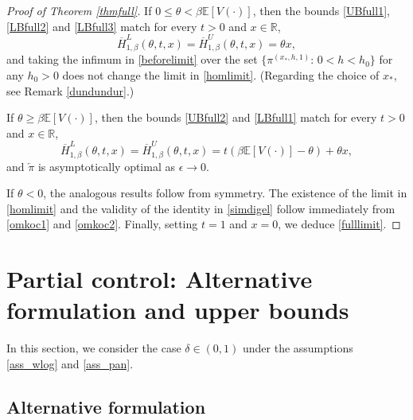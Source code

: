 \documentclass[a4paper]{amsart}
\numberwithin{equation}{section}
\theoremstyle{plain}
\theoremstyle{remark}
\begin{document}
\begin{proof}[Proof of Theorem \ref{thmfull}]
If $0\le\theta<\beta\mathbb{E}[V(\cdot)]$, then the bounds \eqref{UBfull1}, \eqref{LBfull2} and \eqref{LBfull3} match for every $t>0$ and $x\in\mathbb{R}$,
\begin{equation}\label{omkoc1}
\overline H_{1,\beta}^L(\theta,t,x) = \overline H_{1,\beta}^U(\theta,t,x) = \theta x,
\end{equation}
and taking the infimum in \eqref{beforelimit} over the set $\{{\pi^{(x_*,h,1)}}:\,0<h<h_0\}$ for any $h_0>0$ does not change the limit in \eqref{homlimit}. (Regarding the choice of $x_*$, see Remark \ref{dundundur}.)

If $\theta\ge\beta\mathbb{E}[V(\cdot)]$, then the bounds \eqref{UBfull2} and \eqref{LBfull1} match for every $t>0$ and $x\in\mathbb{R}$,
\begin{equation}\label{omkoc2}
\overline H_{1,\beta}^L(\theta,t,x) = \overline H_{1,\beta}^U(\theta,t,x) = t(\beta\mathbb{E}[V(\cdot)] - \theta) + \theta x,
\end{equation}
and ${\overleftarrow\pi}$ is asymptotically optimal as ${\epsilon}\to0$.

If $\theta<0$, the analogous results follow from symmetry. The existence of the limit in \eqref{homlimit} and the validity of the identity in \eqref{simdigel} follow immediately from \eqref{omkoc1} and \eqref{omkoc2}. Finally, setting $t=1$ and $x=0$, we deduce \eqref{fulllimit}.
\end{proof}

\section{Partial control: Alternative formulation and upper bounds}

In this section, we consider the case $\delta\in(0,1)$ under the assumptions \eqref{ass_wlog} and \eqref{ass_pan}.

\subsection{Alternative formulation}\label{hssira}
\end{document}
